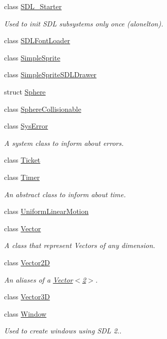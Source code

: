 \begin{DoxyCompactItemize}
\item 
class \hyperlink{classzbe_1_1_s_d_l___starter}{S\+D\+L\+\_\+\+Starter}
\begin{DoxyCompactList}\small\item\em Used to init S\+D\+L subsystems only once (alonelton). \end{DoxyCompactList}\item 
class \hyperlink{classzbe_1_1_s_d_l_font_loader}{S\+D\+L\+Font\+Loader}
\item 
class \hyperlink{classzbe_1_1_simple_sprite}{Simple\+Sprite}
\item 
class \hyperlink{classzbe_1_1_simple_sprite_s_d_l_drawer}{Simple\+Sprite\+S\+D\+L\+Drawer}
\item 
struct \hyperlink{structzbe_1_1_sphere}{Sphere}
\item 
class \hyperlink{classzbe_1_1_sphere_collisionable}{Sphere\+Collisionable}
\item 
class \hyperlink{classzbe_1_1_sys_error}{Sys\+Error}
\begin{DoxyCompactList}\small\item\em A system class to inform about errors. \end{DoxyCompactList}\item 
class \hyperlink{classzbe_1_1_ticket}{Ticket}
\item 
class \hyperlink{classzbe_1_1_timer}{Timer}
\begin{DoxyCompactList}\small\item\em An abstract class to inform about time. \end{DoxyCompactList}\item 
class \hyperlink{classzbe_1_1_uniform_linear_motion}{Uniform\+Linear\+Motion}
\item 
class \hyperlink{classzbe_1_1_vector}{Vector}
\begin{DoxyCompactList}\small\item\em A class that represent Vectors of any dimension. \end{DoxyCompactList}\item 
class \hyperlink{classzbe_1_1_vector2_d}{Vector2\+D}
\begin{DoxyCompactList}\small\item\em An aliases of a \hyperlink{classzbe_1_1_vector}{Vector$<$2$>$}. \end{DoxyCompactList}\item 
class \hyperlink{classzbe_1_1_vector3_d}{Vector3\+D}
\item 
class \hyperlink{classzbe_1_1_window}{Window}
\begin{DoxyCompactList}\small\item\em Used to create windows using S\+D\+L 2.. \end{DoxyCompactList}\end{DoxyCompactItemize}
